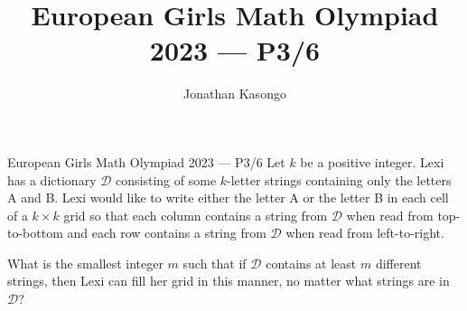 \documentclass{article}
\author{Jonathan Kasongo}
\title{European Girls Math Olympiad 2023 --- P3/6}
\begin{document}
\maketitle

\begin{problem}{European Girls Math Olympiad 2023 --- P3/6}
Let $k$ be a positive integer. Lexi has a dictionary $\mathcal{D}$
consisting of some
$k$-letter strings containing only the letters A and B.
Lexi would like to write either the
letter A or the letter B in each cell of a $k \times k$ grid so that each
column contains a string
from $\mathcal{D}$ when read from top-to-bottom and each row contains a
string from $\mathcal{D}$ when read
from left-to-right.
\vspace{0.2cm}

What is the smallest integer $m$ such that if $\mathcal{D}$ contains at
least $m$ different strings, then
Lexi can fill her grid in this manner, no matter what strings are in
$\mathcal{D}$?
\end{problem}
\end{document}
